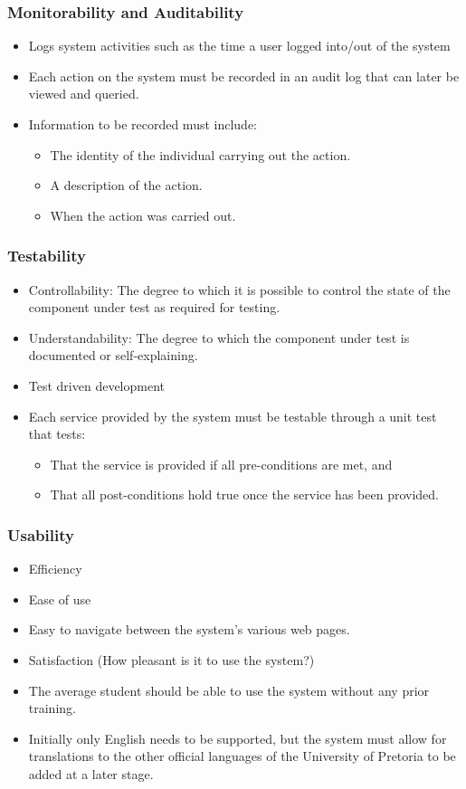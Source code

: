 \documentclass[12pt, oneside]{article}
\begin{document}
		\subsubsection{Monitorability and Auditability}
			\begin{itemize}
				\item Logs system activities such as the time a user logged into/out of the system
				\item Each action on the system must be recorded in an audit log that can later be viewed and queried.
				\item Information to be recorded must include:
				\begin{itemize}
					\item The identity of the individual carrying out the action.
					\item A description of the action.
					\item When the action was carried out.
				\end{itemize}
			\end{itemize}
		\subsubsection{Testability}
			\begin{itemize}
				\item Controllability: The degree to which it is possible to control the state of the component under test as required for testing.
				\item Understandability: The degree to which the component under test is documented or self-explaining.
				\item Test driven development
				\item Each service provided by the system must be testable through a unit test that tests:
				\begin{itemize}
					\item That the service is provided if all pre-conditions are met, and
					\item That all post-conditions hold true once the service has been provided.
				\end{itemize}
			\end{itemize}
		\subsubsection{Usability}
			\begin{itemize}
				\item Efficiency
				\item Ease of use
				\item Easy to navigate between the system's various web pages.
				\item Satisfaction (How pleasant is it to use the system?)
				\item The average student should be able to use the system without any prior training.
				\item Initially only English needs to be supported, but the system must allow for translations to the other official languages of the University of Pretoria to be added at a later stage.
			\end{itemize}
\end{document}
